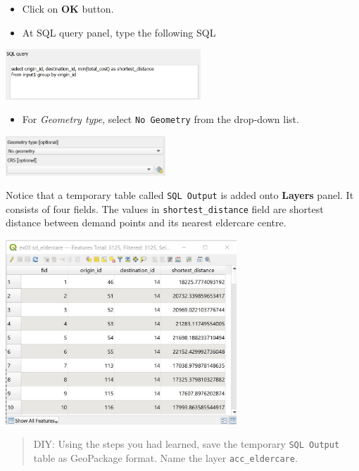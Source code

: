 \documentclass[
  letterpaper,
  DIV=11,
  numbers=noendperiod]{scrreprt}
\providecommand{\tightlist}{%
  \setlength{\itemsep}{0pt}\setlength{\parskip}{0pt}}\usepackage{longtable,booktabs,array}
\begin{document}
\begin{itemize}
\item
  Click on \textbf{OK} button.
\item
  At SQL query panel, type the following SQL
\end{itemize}

\includegraphics[width=0.55\textwidth,height=\textheight]{./img09/image32.jpg}

\begin{itemize}
\tightlist
\item
  For \emph{Geometry type}, select \texttt{No\ Geometry} from the
  drop-down list.
\end{itemize}

\includegraphics[width=0.45\textwidth,height=\textheight]{./img09/image33.jpg}

Notice that a temporary table called \texttt{SQL\ Output} is added onto
\textbf{Layers} panel. It consists of four fields. The values in
\texttt{shortest\_distance} field are shortest distance between demand
points and its nearest eldercare centre.

\includegraphics[width=0.65\textwidth,height=\textheight]{./img09/image34.jpg}

\begin{quote}
DIY: Using the steps you had learned, save the temporary
\texttt{SQL\ Output} table as GeoPackage format. Name the layer
\texttt{acc\_eldercare}.
\end{quote}
\end{document}
